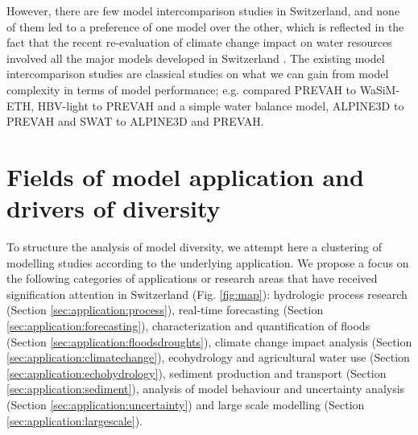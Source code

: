 \documentclass[10pt,a4paper]{article}
\begin{document}
However, there are few model intercomparison studies in Switzerland, and none of them led to a preference of one model over the other, which is reflected in the fact that the recent re-evaluation of climate change impact on water resources involved all the major models developed in Switzerland  \citep{bafu2021}. The existing model intercomparison studies are classical studies on what we can gain from model complexity in terms of model performance; e.g. \citet{Gurtz2003} compared PREVAH to WaSiM-ETH, \citet{Orth2015} HBV-light to PREVAH and a simple water balance model, \citet{Kobierska_2013} ALPINE3D to PREVAH and \citet{Andrianaki2019} SWAT to ALPINE3D and PREVAH.


\section{Fields of model application and drivers of diversity}
\label{sec:application}

To structure the analysis of model diversity, we attempt here a clustering of modelling studies according to the underlying application. We propose a focus on the following categories of applications or research areas that have received signification attention in Switzerland (Fig. \ref{fig:map}): hydrologic process research (Section \ref{sec:application:process}), real-time forecasting  (Section \ref{sec:application:forecasting}), characterization and  quantification of floods (Section \ref{sec:application:floodsdroughts}),  climate change impact analysis (Section \ref{sec:application:climatechange}),  ecohydrology and agricultural water use (Section \ref{sec:application:echohydrology}), sediment production and transport (Section \ref{sec:application:sediment}), analysis of model behaviour and uncertainty analysis (Section \ref{sec:application:uncertainty}) and large scale modelling (Section \ref{sec:application:largescale}).
\end{document}
